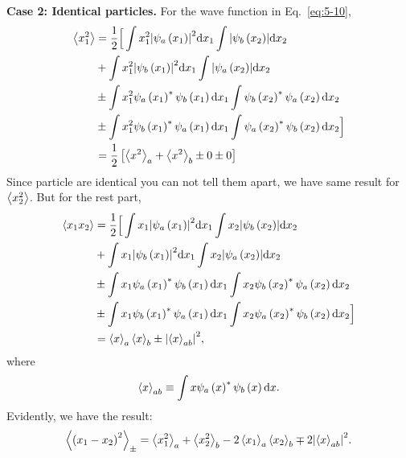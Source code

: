 \textbf{Case 2: Identical particles.} For the wave function in Eq.~\eqref{eq:5-10},
\begin{align*}
  \expval{x_1^2} &= \frac{1}{2} \Big[ \int x_1^2 \abs{ \psi_a \left( x_1 \right) }^2 \dd x_1 \int \abs{\psi_b \left( x_2 \right)} \dd x_{2}\\
                 &+  \int x_1^2 \abs{ \psi_b \left( x_1 \right) }^2 \dd x_1 \int \abs{\psi_a \left( x_2 \right)} \dd x_{2}\\
                 &\pm \int x_1^2 \psi_a \left( x_1 \right)^{*} \psi_b \left( x_1 \right) \dd x_1 \int \psi_b \left( x_2 \right)^{*} \psi_a \left( x_2 \right) \dd x_{2}\\
                 &\pm \int x_1^2 \psi_b \left( x_1 \right)^{*} \psi_a \left( x_1 \right) \dd x_1 \int \psi_a \left( x_2 \right)^{*} \psi_b \left( x_2 \right) \dd x_{2} \Big] \\
                 &= \frac{1}{2} \left[ \expval{x^2}_a + \expval{x^2}_b \pm 0 \pm 0 \right]
\end{align*}
Since particle are identical you can not tell them apart, we have same result for $\expval{x_2^{2}}$.
But for the rest part,
\begin{align*}
  \expval{x_1 x_2} &= \frac{1}{2} \Big[ \int x_1 \abs{ \psi_a \left( x_1 \right) }^2 \dd x_1 \int x_2 \abs{\psi_b \left( x_2 \right)} \dd x_{2}\\
                   &+  \int x_1 \abs{ \psi_b \left( x_1 \right) }^2 \dd x_1 \int x_2 \abs{\psi_a \left( x_2 \right)} \dd x_{2}\\
                   &\pm \int x_1 \psi_a \left( x_1 \right)^{*} \psi_b \left( x_1 \right) \dd x_1 \int x_2 \psi_b \left( x_2 \right)^{*} \psi_a \left( x_2 \right) \dd x_{2}\\
                   &\pm \int x_1 \psi_b \left( x_1 \right)^{*} \psi_a \left( x_1 \right) \dd x_1 \int x_2 \psi_a \left( x_2 \right)^{*} \psi_b \left( x_2 \right) \dd x_{2} \Big] \\
                   &= \expval{x}_a \expval{x}_b \pm \abs{ \expval{x}_{ab} }^{2},
\end{align*}
where
\begin{equation}
  \label{eq:5-13}
 \expval{x}_{ab} \equiv \int x \psi_a \left( x \right)^{*} \psi_b \left( x \right) \dd x.
\end{equation}
Evidently, we have the result:
\begin{equation}
  \label{eq:5-14}
   \expval{\left( x_1 - x_2 \right)^2}_\pm = \expval{x_1^2}_a + \expval{x_2^2}_b - 2\expval{x_1}_a\expval{x_2}_b \mp 2 \abs{\expval{x}_{ab}}^{2}.
\end{equation}

